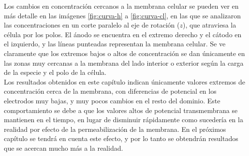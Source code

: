Los cambios en concentración cercanos a la membrana celular se pueden ver en más detalle en las imágenes \ref{fig:curva-h} a \ref{fig:curva-cl}, en las que se analizaron las concentraciones en un corte paralelo al eje de rotación ($z$), que atraviesa la célula por los polos. El ánodo se encuentra en el extremo derecho y el cátodo en el izquierdo, y las líneas punteadas representan la membrana celular. Se ve claramente que los extremos bajos o altos de concentración se dan únicamente en las zonas muy cercanas a la membrana del lado interior o exterior según la carga de la especie y el polo de la célula.\\

Los resultados obtenidos en este capítulo indican únicamente valores extremos de concentración cerca de la membrana, con diferencias de potencial en los electrodos muy bajas, y muy pocos cambios en el resto del dominio. Este comportamiento se debe a que los valores altos de potencial transmembrana se mantienen en el tiempo, en lugar de disminuir rápidamente como sucedería en la realidad por efecto de la permeabilización de la membrana. En el próximos capítulo se tendrá en cuenta este efecto, y por lo tanto se obtendrán resultados que se acercan mucho más a la realidad.


